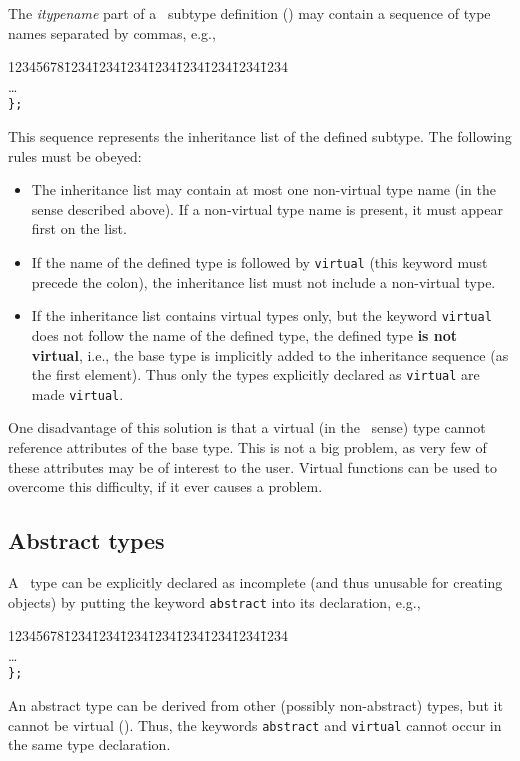 The {\em itypename\/} part of a \smurph\ subtype definition
() may contain a sequence of type names separated by commas,
e.g.,
{\tt\begin{tabbing}
12345678\=1234\=1234\=1234\=1234\=1234\=1234\=1234\=1234\kill
{}\\
\> \>\ldots \\
\> {\tt \};}
\end{tabbing}}
This sequence represents the inheritance list of the defined subtype.
The following rules must be obeyed:
\begin{itemize}
\item
The inheritance list may contain at most one non-virtual type name (in the
sense described above).
If a non-virtual type name is present, it must appear first on the list.
\item
If the name of the defined type is followed by {\tt virtual} (this keyword
must precede the colon), the inheritance list must not include a
non-virtual type.
\item
If the inheritance list contains virtual types only, but the keyword
{\tt virtual} does not follow the name of the defined type, the defined
type {\bf is not virtual}, i.e., the base type is implicitly added to
the inheritance sequence (as the first element).
Thus only the types explicitly declared as {\tt virtual} are made {\tt virtual}.
\end{itemize}

One disadvantage of this solution is that a virtual (in the \smurph\ sense)
type cannot reference attributes of the base type.
This is not a big problem, as very few of these attributes may be of
interest to the user.
Virtual functions can be used to overcome this difficulty, if it ever
causes a problem.

\subsection{Abstract types}
\label{rm_st_ab}

A \smurph\ type can be explicitly declared as incomplete (and thus unusable
for creating objects) by putting the keyword {\tt abstract} into its
declaration, e.g.,
{\tt\begin{tabbing}
12345678\=1234\=1234\=1234\=1234\=1234\=1234\=1234\=1234\kill
{}\\
\> \>\ldots \\
\> {\tt \};}
\end{tabbing}}
\noindent
An abstract type can be derived from other (possibly non-abstract) types, but
it cannot be virtual ().
Thus, the keywords {\tt abstract} and {\tt virtual} cannot occur in the same
type declaration.

